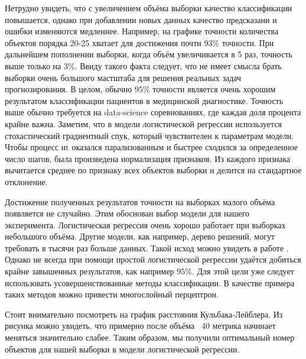 \documentclass[12pt,twoside]{article}
\begin{document}
Нетрудно увидеть, что с увеличением объёма выборки качество классификации повышается, однако при добавлении новых данных качество предсказани и ошибки изменяются медленнее. Например, на графике точности количества объектов порядка 20-25 хватает для достижения почти $93\%$ точности. При дальнейшем пополнении выборки, когда объём увеличивается в 5 раз, точность выше только на $3\%$. Ввиду такого факта следует, что не имеет смысла брать выборки очень большого мастштаба для решения реальных задач прогнозирования. В целом, обычно $95\%$ точности является очень хорошим результатом классификации пациентов в медицинской диагностике. Точность выше обычно требуется на data-science соревнованиях, где каждая доля процента крайне важна. Заметим, что в модели логистической регрессии используется стохастический градиентный спук, который чувствителен к параметрам модели. Чтобы процесс нt оказался парализованным и быстрее сходился за определенное число шагов, была произведена нормализация признаков. Из каждого признака вычитается среднее по признаку всех объектов выборки и делится на стандартное отклонение.

Достижение полученных результатов точности на выборках малого объёма появляется не случайно. Этим обоснован выбор модели для нашего эксперимента. Логистическая регрессия очень хорошо работает при выборках небольшого объёма. Другие модели, как например, дерево решений, могут требовать в тысячи раз больше данных. Такой исход можно увидеть в работе \cite{smpltr}. Однако не всегда при помощи простой логистической регрессии удаётся добиться крайне завышенных результатов, как например $95\%$. Для этой цели уже следует использовать усовершенствованные методы классификации. В качестве примера таких методов можно привести многослойный перцептрон.
  

\begin{figure}[h]
	\centering
	\label{fg:kl}
\end{figure}

Стоит внимательно посмотреть на график расстояния Кульбака-Лейблера. Из рисунка можно увидеть, что примерно после объёма ~40 метрика начинает меняться значительно слабее. Таким образом, мы получили оптимальный номер объектов для нашей выборки в модели логистической регрессии.
 
\end{document}
